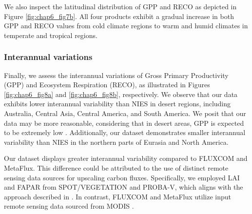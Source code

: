 We also inspect the latitudinal distribution of GPP and RECO as depicted in Figure \ref{fig:chap6_fig7b}. All four products exhibit a gradual increase in both GPP and RECO values from cold climate regions to warm and humid climates in temperate and tropical regions. \par
\subsubsection*{Interannual variations}
Finally, we assess the interannual variations of Gross Primary Productivity (GPP) and Ecosystem Respiration (RECO), as illustrated in Figures \ref{fig:chap6_fig8a} and \ref{fig:chap6_fig8b}, respectively. We observe that our data exhibits lower interannual variability than NIES in desert regions, including Australia, Central Asia, Central America, and South America. We posit that our data may be more reasonable, considering that in desert areas, GPP is expected to be extremely low \citep{hadley1981productivity}. Additionally, our dataset demonstrates smaller interannual variability than NIES in the northern parts of Eurasia and North America. \par
Our dataset displays greater interannual variability compared to FLUXCOM and MetaFlux. This difference could be attributed to the use of distinct remote sensing data sources for upscaling carbon fluxes. Specifically, we employed LAI and FAPAR from SPOT/VEGETATION and PROBA-V, which aligns with the approach described in \citep{zeng2020global}. In contrast, FLUXCOM and MetaFlux utilize input remote sensing data sourced from MODIS \citep{jung2019fluxcom, nathaniel2023metaflux}. \par
